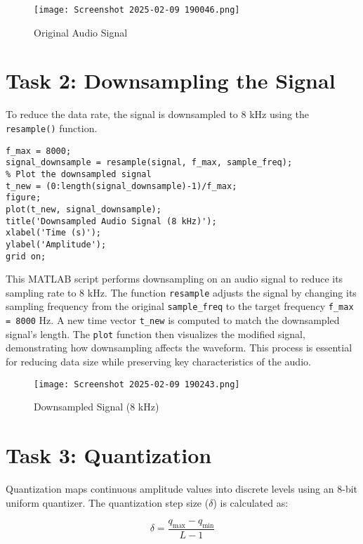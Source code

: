 \documentclass[a4paper,12pt]{article}
\begin{document}
\begin{figure}[H]
    \centering
    \texttt{[image: Screenshot 2025-02-09 190046.png]}
    \caption{Original Audio Signal}
\end{figure}

\section{Task 2: Downsampling the Signal}
To reduce the data rate, the signal is downsampled to 8 kHz using the \texttt{resample()} function.

\begin{lstlisting}[style=matlab, caption=Downsampling the Signal]
f_max = 8000;
signal_downsample = resample(signal, f_max, sample_freq);
% Plot the downsampled signal
t_new = (0:length(signal_downsample)-1)/f_max;
figure;
plot(t_new, signal_downsample);
title('Downsampled Audio Signal (8 kHz)');
xlabel('Time (s)');
ylabel('Amplitude');
grid on;
\end{lstlisting}
This MATLAB script performs downsampling on an audio signal to reduce its sampling rate to 8 kHz. The function \texttt{resample} adjusts the signal by changing its sampling frequency from the original \texttt{sample\_freq} to the target frequency \texttt{f\_max = 8000} Hz. A new time vector \texttt{t\_new} is computed to match the downsampled signal's length. The \texttt{plot} function then visualizes the modified signal, demonstrating how downsampling affects the waveform. This process is essential for reducing data size while preserving key characteristics of the audio.

\begin{figure}[H]
    \centering
    \texttt{[image: Screenshot 2025-02-09 190243.png]}
    \caption{Downsampled Signal (8 kHz)}
\end{figure}

\section{Task 3: Quantization}
Quantization maps continuous amplitude values into discrete levels using an 8-bit uniform quantizer. The quantization step size (\(\delta\)) is calculated as:

\begin{equation}
    \delta = \frac{q_{\max} - q_{\min}}{L-1}
\end{equation}
\end{document}
